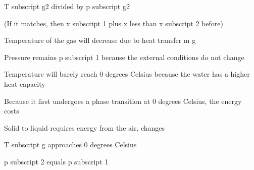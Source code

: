 T subscript g2 divided by p subscript g2

(If it matches, then x subscript 1 plus x less than x subscript 2 before)

Temperature of the gas will decrease due to heat transfer m g

Pressure remains p subscript 1 because the external conditions do not change

Temperature will barely reach 0 degrees Celsius because the water has a higher heat capacity

Because it first undergoes a phase transition at 0 degrees Celsius, the energy costs

Solid to liquid requires energy from the air, changes

T subscript g approaches 0 degrees Celsius

p subscript 2 equals p subscript 1